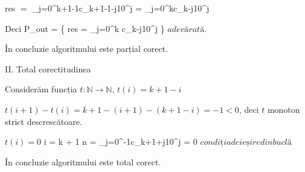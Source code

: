 \documentclass[11pt]{article}
\begin{document}
res $=$ \sum\limits_{j=0}^{k+1-1}c_{k+1-1-j}10^{j}
= \sum\limits_{j=0}^{k}c_{k-j}10^{j}

Deci P_{out} = \left\{ res = \sum\limits_{j=0}^{k} c_{k-j}10^{j} \right\} $ adevărată$.

În concluzie algoritmului este parțial corect.

\vspace{14pt}
\noindent
II. Total corectitudinea
\newline

Considerăm funcția $t: \mathbb{N} \to \mathbb{N}$, $t(i) = k + 1 - i$

$t(i + 1) - t(i) = k + 1 - (i + 1) - (k + 1 - i) = -1 < 0$, deci $t$ monoton strict descrescătoare.

$t(i) = 0$ \iff i = k + 1 \iff n = \sum\limits_{j=0}^{-1}c_{k+1+j}10^{j} = 0
 \iff $condiția de ieșire din buclă$


În concluzie algoritmului este total corect.
\end{document}
